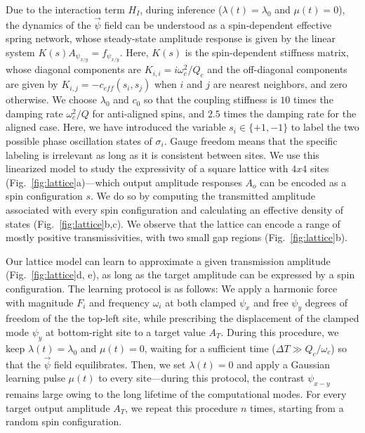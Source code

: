 Due to the interaction term $H_I$, during inference ($\lambda(t)=\lambda_0$ and $\mu(t)=0$), the dynamics of the $\vec{\psi}$ field can be understood as a spin-dependent effective spring network, whose steady-state amplitude response is given by the linear system $K(s)A_{\psi_{x/y}} = f_{\psi_{x/y}}$.  Here, $K(s)$ is the spin-dependent stiffness matrix, whose diagonal components are $K_{i,i}=i\omega_c^2/Q_c$ and the off-diagonal components are given by $K_{i,j}=-c_{eff}(s_i, s_j)$ when $i$ and $j$ are nearest neighbors, and zero otherwise. We choose $\lambda_0$ and $c_0$ so that the coupling stiffness is $10$ times the damping rate $\omega^2_c/Q$ for anti-aligned spins, and $2.5$ times the damping rate for the aligned case. Here, we have introduced the variable $s_i\in\{+1,-1\}$ to label the two possible phase oscillation states of $\sigma_i$. Gauge freedom means that the specific labeling is irrelevant as long as it is consistent between sites. We use this linearized model to study the expressivity of a square lattice with $4x4$ sites (Fig.~\ref{fig:lattice}a)---which output amplitude responses $A_o$ can be encoded as a spin configuration $s$. We do so by computing the transmitted amplitude associated with every spin configuration and calculating an effective density of states (Fig.~\ref{fig:lattice}b,c). We observe that the lattice can encode a range of mostly positive transmissivities, with two small gap regions (Fig.~\ref{fig:lattice}b).

Our lattice model can learn to approximate a given transmission amplitude (Fig.~\ref{fig:lattice}d, e), as long as the target amplitude can be expressed by a spin configuration. The learning protocol is as follows: We apply a harmonic force with magnitude $F_i$ and frequency $\omega_i$ at both clamped $\psi_x$ and free $\psi_y$ degrees of freedom of the the top-left site, while prescribing the displacement of the clamped mode $\psi_y$ at bottom-right site to a target value $A_T$. During this procedure, we keep $\lambda(t)=\lambda_0$ and $\mu(t)=0$, waiting for a sufficient time ($\Delta T\gg Q_c/\omega_c$) so that the $\vec{\psi}$ field equilibrates. Then, we set $\lambda(t)=0$ and apply a Gaussian learning pulse $\mu(t)$ to every site---during this protocol, the contrast $\psi_{x-y}$ remains large owing to the long lifetime of the computational modes.  For every target output amplitude $A_T$, we repeat this procedure $n$ times, starting from a random spin configuration.


